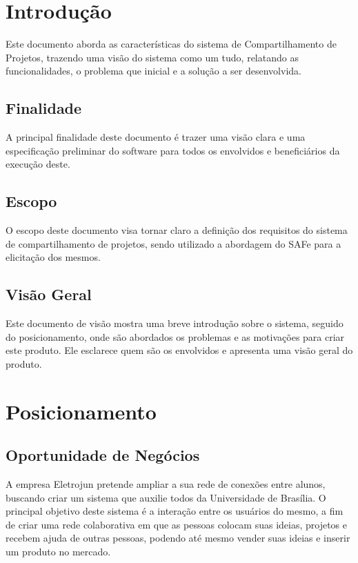 \begin{apendicesenv}
\section{Introdução}

Este documento aborda as características do sistema de Compartilhamento de Projetos, trazendo uma visão do sistema como um tudo, relatando as funcionalidades, o problema que inicial e a solução a ser desenvolvida.

\subsection{Finalidade}

A principal finalidade deste documento é trazer uma visão clara e uma especificação preliminar do software para todos os envolvidos e beneficiários da execução deste.

\subsection{Escopo}

O escopo deste documento visa tornar claro a definição dos requisitos do sistema de compartilhamento de projetos, sendo utilizado a abordagem do SAFe para a elicitação dos mesmos.

\subsection{Visão Geral}

Este documento de visão mostra uma breve introdução sobre o sistema, seguido do posicionamento, onde são abordados os problemas e as motivações para criar este produto. Ele esclarece quem são os envolvidos e  apresenta uma visão geral do produto.

\section{Posicionamento}

\subsection{Oportunidade de Negócios}

A empresa Eletrojun pretende ampliar a sua rede de conexões entre alunos, buscando criar um sistema que auxilie todos da Universidade de Brasília. O principal objetivo deste sistema é a interação entre os usuários do mesmo, a fim de criar uma rede colaborativa em que as pessoas colocam suas ideias, projetos e recebem ajuda de outras pessoas, podendo até mesmo vender suas ideias e inserir um produto no mercado.


\end{apendicesenv}
